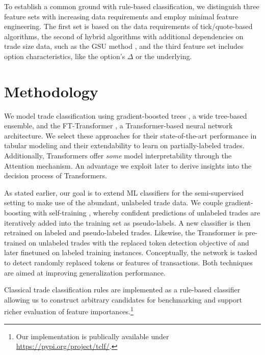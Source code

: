 To establish a common ground with rule-based classification, we distinguish three feature sets with increasing data requirements and employ minimal feature engineering. The first set is based on the data requirements of tick/quote-based algorithms, the second of hybrid algorithms with additional dependencies on trade size data, such as the \gls{GSU} method \autocite{grauerOptionTradeClassification2022}, and the third feature set includes option characteristics, like the option's $\Delta$ or the underlying. 

\section{Methodology}

We model trade classification using gradient-boosted trees \autocites[][]{friedmanGreedyFunctionApproximation2001}, a wide tree-based ensemble, and the FT-Transformer \autocite{gorishniyRevisitingDeepLearning2021}, a Transformer-based neural network architecture. We select these approaches for their state-of-the-art performance in tabular modeling \autocites[][]{gorishniyRevisitingDeepLearning2021}[][]{grinsztajnWhyTreebasedModels2022} and their extendability to learn on partially-labeled trades. Additionally, Transformers offer \textit{some} model interpretability through the Attention mechanism. An advantage we exploit later to derive insights into the decision process of Transformers.

As stated earlier, our goal is to extend \gls{ML} classifiers for the semi-supervised setting to make use of the abundant, unlabeled trade data. We couple gradient-boosting with self-training \autocite{yarowskyUnsupervisedWordSense1995}, whereby confident predictions of unlabeled trades are iteratively added into the training set as pseudo-labels. A new classifier is then retrained on labeled and pseudo-labeled trades. Likewise, the Transformer is pre-trained on unlabeled trades with the replaced token detection objective of \textcite{clarkElectraPretrainingText2020} and later finetuned on labeled training instances. Conceptually, the network is tasked to detect randomly replaced tokens or features of transactions. Both techniques are aimed at improving generalization performance.

Classical trade classification rules are implemented as a rule-based classifier allowing us to construct arbitrary candidates for benchmarking and support richer evaluation of feature importances.\footnote{Our implementation is publically available under \url{https://pypi.org/project/tclf/}.}

